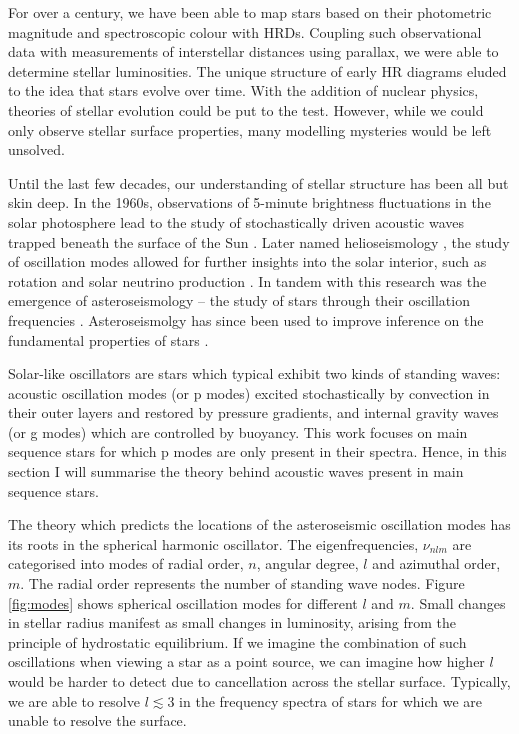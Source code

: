 For over a century, we have been able to map stars based on their photometric magnitude and spectroscopic colour with HRDs. Coupling such observational data with measurements of interstellar distances using parallax, we were able to determine stellar luminosities. The unique structure of early HR diagrams eluded to the idea that stars evolve over time. With the addition of nuclear physics, theories of stellar evolution could be put to the test. However, while we could only observe stellar surface properties, many modelling mysteries would be left unsolved.

Until the last few decades, our understanding of stellar structure has been all but skin deep. In the 1960s, observations of 5-minute brightness fluctuations in the solar photosphere lead to the study of stochastically driven acoustic waves trapped beneath the surface of the Sun \citep{Ulrich1970, Ando.Osaki1975}. Later named helioseismology \citep{Deubner.Gough1984}, the study of oscillation modes allowed for further insights into the solar interior, such as rotation \citep{Deubner.Ulrich.ea1979} and solar neutrino production \citep{Bahcall.Ulrich1988}. In tandem with this research was the emergence of asteroseismology -- the study of stars through their oscillation frequencies \citep{Christensen-Dalsgaard1984}. Asteroseismolgy has since been used to improve inference on the fundamental properties of stars \citep[see, e.g.][]{Ulrich1986, Soderblom2010, SilvaAguirre.Davies.ea2015}.

Solar-like oscillators are stars which typical exhibit two kinds of standing waves: acoustic oscillation modes (or p modes) excited stochastically by convection in their outer layers and restored by pressure gradients, and internal gravity waves (or g modes) which are controlled by buoyancy. This work focuses on main sequence stars for which p modes are only present in their spectra. Hence, in this section I will summarise the theory behind acoustic waves present in main sequence stars.

The theory which predicts the locations of the asteroseismic oscillation modes has its roots in the spherical harmonic oscillator. The eigenfrequencies, $\nu_{nlm}$ are categorised into modes of radial order, $n$, angular degree, $l$ and azimuthal order, $m$. The radial order represents the number of standing wave nodes. Figure \ref{fig:modes} shows spherical oscillation modes for different $l$ and $m$. Small changes in stellar radius manifest as small changes in luminosity, arising from the principle of hydrostatic equilibrium. If we imagine the combination of such oscillations when viewing a star as a point source, we can imagine how higher $l$ would be harder to detect due to cancellation across the stellar surface. Typically, we are able to resolve $l \lesssim 3$ in the frequency spectra of stars for which we are unable to resolve the surface.


